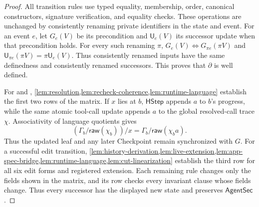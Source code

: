 \begin{proof}
All transition rules use typed equality, membership, order, canonical constructors, signature verification, and equality checks.
These operations are unchanged by consistently renaming private identifiers in the state and event.
For an event \(e\), let \(G_e(V)\) be its precondition and \(\mathsf U_e(V)\) its successor update when that precondition holds.
For every such renaming \(\pi\), \(G_e(V)\Longleftrightarrow G_{\pi e}(\pi V)\) and \(\mathsf U_{\pi e}(\pi V)=\pi\mathsf U_e(V)\).
Thus consistently renamed inputs have the same definedness and consistently renamed successors.
This proves that \(\partial\) is well defined.

For \Fresh and \Alias, \cref{lem:resolution,lem:recheck-coherence,lem:runtime-language} establish the first two rows of the matrix.
If \(x\) lies at \(b\), \(\mathsf{HStep}\) appends \(a\) to \(b\)'s progress, while the same atomic tool-call update appends \(a\) to the global resolved-call trace \(\chi\).
Associativity of language quotients gives
\[
 (\Gamma_b/\mathsf{raw}(\chi_b))/x
 =\Gamma_b/\mathsf{raw}(\chi_ba).
\]
Thus the updated leaf and any later Checkpoint remain synchronized with \(G\).
For a successful edit transition, \cref{lem:history-derivation,lem:live-extension,lem:app-spec-bridge,lem:runtime-language,lem:cut-linearization} establish the third row for all six edit forms and registered extension.
Each remaining rule changes only the fields shown in the matrix, and its row checks every invariant clause whose fields change.
Thus every successor has the displayed new state and preserves \(\mathsf{AgentSec}\).
\end{proof}

